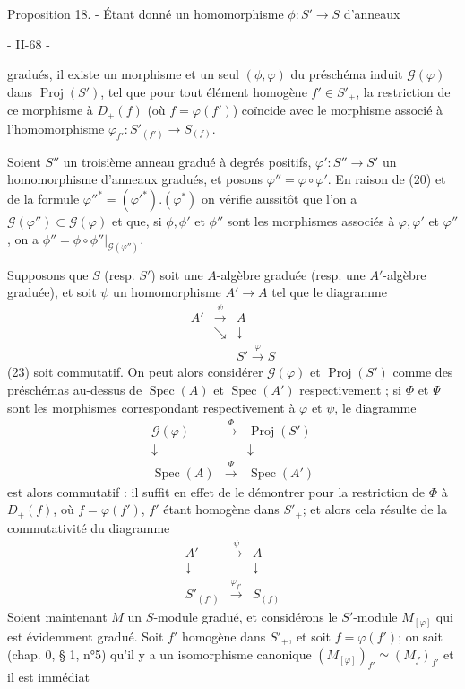 Proposition 18. - Étant donné un homomorphisme $\phi : S' \to S$ d'anneaux

\newpage


- II-68 -

gradués, il existe un morphisme et un seul $(\phi, \varphi)$ du préschéma induit $\mathcal{G}(\varphi)$ dans $\operatorname{Proj}(S')$, tel que pour tout élément homogène $f' \in S'_+$, la restriction de ce morphisme à $D_+(f)$ (où $f = \varphi(f')$) coïncide avec le morphisme associé à l'homomorphisme $\varphi_{f'} : S'_{(f')} \to S_{(f)}$.

Soient $S''$ un troisième anneau gradué à degrés positifs, $\varphi' : S'' \to S'$ un homomorphisme d'anneaux gradués, et posons $\varphi'' = \varphi \circ \varphi'$. En raison de (20) et de la formule $\varphi''^* = (\varphi'^*).(\varphi^*)$ on vérifie aussitôt que l'on a $\mathcal{G}(\varphi'') \subset \mathcal{G}(\varphi)$ et que, si $\phi, \phi'$ et $\phi''$ sont les morphismes associés à $\varphi, \varphi'$ et $\varphi''$, on a $\phi'' = \phi \circ \phi''|_{\mathcal{G}(\varphi'')}$.

Supposons que $S$ (resp. $S'$) soit une $A$-algèbre graduée (resp. une $A'$-algèbre graduée), et soit $\psi$ un homomorphisme $A' \to A$ tel que le diagramme
$$\begin{array}{ccc} A' & \xrightarrow{\psi} & A \\ & \searrow & \downarrow \\ & & S' \xrightarrow{\varphi} S \end{array}$$
(23)
soit commutatif. On peut alors considérer $\mathcal{G}(\varphi)$ et $\operatorname{Proj}(S')$ comme des préschémas au-dessus de $\operatorname{Spec}(A)$ et $\operatorname{Spec}(A')$ respectivement ; si $\Phi$ et $\Psi$ sont les morphismes correspondant respectivement à $\varphi$ et $\psi$, le diagramme
$$\begin{array}{ccc} \mathcal{G}(\varphi) & \xrightarrow{\Phi} & \operatorname{Proj}(S') \\ \downarrow & & \downarrow \\ \operatorname{Spec}(A) & \xrightarrow{\Psi} & \operatorname{Spec}(A') \end{array}$$
est alors commutatif : il suffit en effet de le démontrer pour la restriction de $\Phi$ à $D_+(f)$, où $f = \varphi(f')$, $f'$ étant homogène dans $S'_+$; et alors cela résulte de la commutativité du diagramme
$$\begin{array}{ccc} A' & \xrightarrow{\psi} & A \\ \downarrow & & \downarrow \\ S'_{(f')} & \xrightarrow{\varphi_{f'}} & S_{(f)} \end{array}$$
Soient maintenant $M$ un $S$-module gradué, et considérons le $S'$-module $M_{[\varphi]}$ qui est évidemment gradué. Soit $f'$ homogène dans $S'_+$, et soit $f = \varphi(f')$; on sait (chap. 0, § 1, n°5) qu'il y a un isomorphisme canonique $(M_{[\varphi]})_{f'} \simeq (M_f)_{f'}$ et il est immédiat

